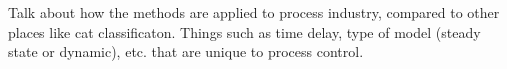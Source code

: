 %
% 

Talk about how the methods are applied to process industry, compared to other places like cat classificaton.  Things such as time delay, type of model (steady state or dynamic), etc. that are unique to process control.